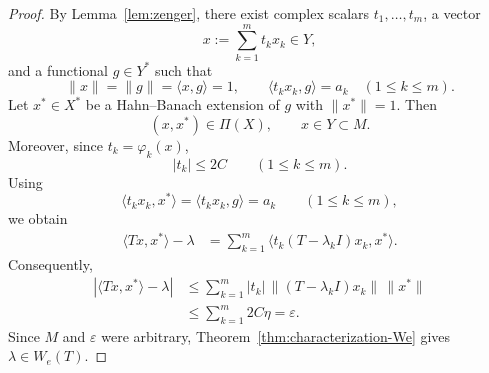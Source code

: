 \documentclass[10pt,a4paper]{amsart}
\begin{document}
\begin{proof}
By Lemma~\ref{lem:zenger}, there exist complex scalars \(t_1,\ldots,t_m\), a
vector
\[
        x:=\sum_{k=1}^m t_kx_k\in Y,
\]
and a functional \(g\in Y^*\) such that
\[
        \|x\|=\|g\|=\langle x,g\rangle=1,
        \qquad
        \langle t_kx_k,g\rangle=a_k
        \quad (1\le k\le m).
\]
Let \(x^*\in X^*\) be a Hahn--Banach extension of \(g\) with
\(\|x^*\|=1\). Then
\[
        (x,x^*)\in\Pi(X),
        \qquad
        x\in Y\subset M.
\]
Moreover, since \(t_k=\varphi_k(x)\),
\[
        |t_k|\le 2C
        \qquad (1\le k\le m).
\]
Using
\[
        \langle t_kx_k,x^*\rangle
        =
        \langle t_kx_k,g\rangle
        =
        a_k
        \qquad (1\le k\le m),
\]
we obtain
\[
\begin{aligned}
        \langle Tx,x^*\rangle-\lambda
        &=
        \sum_{k=1}^m
        \langle t_k(T-\lambda_kI)x_k,x^*\rangle .
\end{aligned}
\]
Consequently,
\[
\begin{aligned}
        |\langle Tx,x^*\rangle-\lambda|
        &\le
        \sum_{k=1}^m
        |t_k|\,\|(T-\lambda_kI)x_k\|\,\|x^*\|  \\
        &\le
        \sum_{k=1}^m 2C\eta
        =
        \varepsilon .
\end{aligned}
\]
Since \(M\) and \(\varepsilon\) were arbitrary, 
 Theorem~\ref{thm:characterization-We} gives
\(\lambda\in W_e(T)\).
\end{proof}
\end{document}
